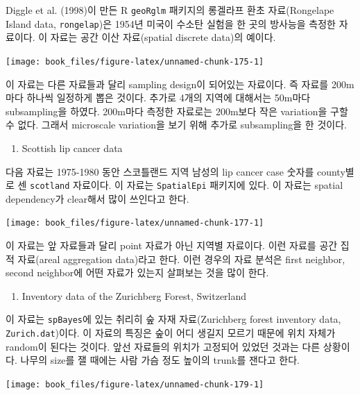 \documentclass[b5paper,]{book}
\providecommand{\tightlist}{%
  \setlength{\itemsep}{0pt}\setlength{\parskip}{0pt}}
\theoremstyle{definition}
\theoremstyle{definition}
\theoremstyle{definition}
\theoremstyle{remark}
\begin{document}
Diggle et al. (1998)이 만든 R \texttt{geoRglm} 패키지의 롱겔라프 환초
자료(Rongelape Island data, \texttt{rongelap})은 1954년 미국이 수소탄
실험을 한 곳의 방사능을 측정한 자료이다. 이 자료는 공간 이산
자료(spatial discrete data)의 예이다.

\begin{center}\texttt{[image: book\_files/figure-latex/unnamed-chunk-175-1]} \end{center}

이 자료는 다른 자료들과 달리 sampling design이 되어있는 자료이다. 즉
자료를 200m마다 하나씩 일정하게 뽑은 것이다. 추가로 4개의 지역에
대해서는 50m마다 subsampling을 하였다. 200m마다 측정한 자료로는 200m보다
작은 variation을 구할 수 없다. 그래서 microscale variation을 보기 위해
추가로 subsampling을 한 것이다.

\begin{enumerate}
\def\labelenumi{\arabic{enumi}.}
\setcounter{enumi}{2}
\tightlist
\item
  Scottish lip cancer data
\end{enumerate}

다음 자료는 1975-1980 동안 스코틀랜드 지역 남성의 lip cancer case 숫자를
county별로 센 \texttt{scotland} 자료이다. 이 자료는 \texttt{SpatialEpi}
패키지에 있다. 이 자료는 spatial dependency가 clear해서 많이 쓰인다고
한다.

\begin{center}\texttt{[image: book\_files/figure-latex/unnamed-chunk-177-1]} \end{center}

이 자료는 앞 자료들과 달리 point 자료가 아닌 지역별 자료이다. 이런
자료를 공간 집적 자료(areal aggregation data)라고 한다. 이런 경우의 자료
분석은 first neighbor, second neighbor에 어떤 자료가 있는지 살펴보는
것을 많이 한다.

\begin{enumerate}
\def\labelenumi{\arabic{enumi}.}
\setcounter{enumi}{3}
\tightlist
\item
  Inventory data of the Zurichberg Forest, Switzerland
\end{enumerate}

이 자료는 \texttt{spBayes}에 있는 취리히 숲 자재 자료(Zurichberg forest
inventory data, \texttt{Zurich.dat})이다. 이 자료의 특징은 숲이 어디
생길지 모르기 때문에 위치 자체가 random이 된다는 것이다. 앞선 자료들의
위치가 고정되어 있었던 것과는 다른 상황이다. 나무의 size를 잴 때에는
사람 가슴 정도 높이의 trunk를 잰다고 한다.

\begin{center}\texttt{[image: book\_files/figure-latex/unnamed-chunk-179-1]} \end{center}
\end{document}
